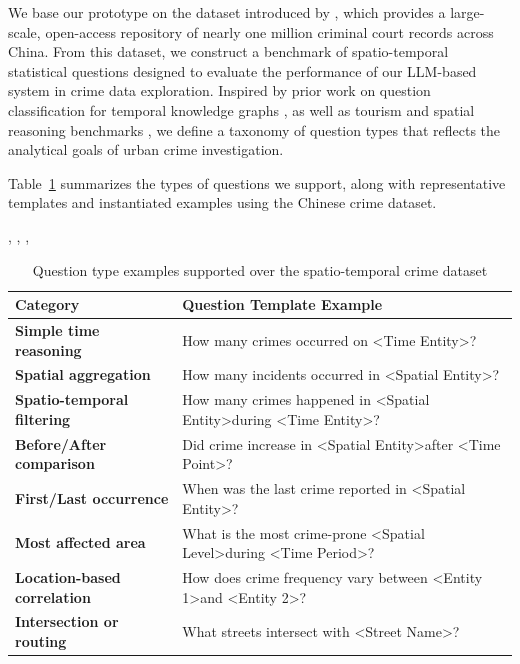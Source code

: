
We base our prototype on the dataset introduced by \cite{Zhang2025CrimeDatasetChina}, which provides a large-scale, open-access repository of nearly one million criminal court records across China. From this dataset, we construct a benchmark of spatio-temporal statistical questions designed to evaluate the performance of our LLM-based system in crime data exploration. Inspired by prior work on question classification for temporal knowledge graphs \cite{Saxena2021TemporalKGQA}, as well as tourism and spatial reasoning benchmarks \cite{Contractor2020QATourism, Dai2024QASTKG}, we define a taxonomy of question types that reflects the analytical goals of urban crime investigation.

Table~\ref{tab:dataset_questions} summarizes the types of questions we support, along with representative templates and instantiated examples using the Chinese crime dataset.


\cite{Unsloth2024Dataset1}, \cite{Unsloth2024WhatModel}, \cite{Li2024NuminaMath}, \cite{Yin2024MuMathCode}

\begin{table}[H]
    \centering
    \caption{Question type examples supported over the spatio-temporal crime dataset}
    \label{tab:dataset_questions}
    \begin{tabular}{|p{4.5cm}|p{10cm}|}
    \hline
    \textbf{Category} & \textbf{Question Template Example} \\
    \hline
    \textbf{Simple time reasoning} & How many crimes occurred on \textless Time Entity\textgreater? \\
    \hline
    \textbf{Spatial aggregation} & How many incidents occurred in \textless Spatial Entity\textgreater? \\
    \hline
    \textbf{Spatio-temporal filtering} & How many crimes happened in \textless Spatial Entity\textgreater during \textless Time Entity\textgreater? \\
    \hline
    \textbf{Before/After comparison} & Did crime increase in \textless Spatial Entity\textgreater after \textless Time Point\textgreater? \\
    \hline
    \textbf{First/Last occurrence} & When was the last crime reported in \textless Spatial Entity\textgreater? \\
    \hline
    \textbf{Most affected area} & What is the most crime-prone \textless Spatial Level\textgreater during \textless Time Period\textgreater? \\
    \hline
    \textbf{Location-based correlation} & How does crime frequency vary between \textless Entity 1\textgreater and \textless Entity 2\textgreater? \\
    \hline
    \textbf{Intersection or routing} & What streets intersect with \textless Street Name\textgreater? \\
    \hline
    \end{tabular}
\end{table}
    

